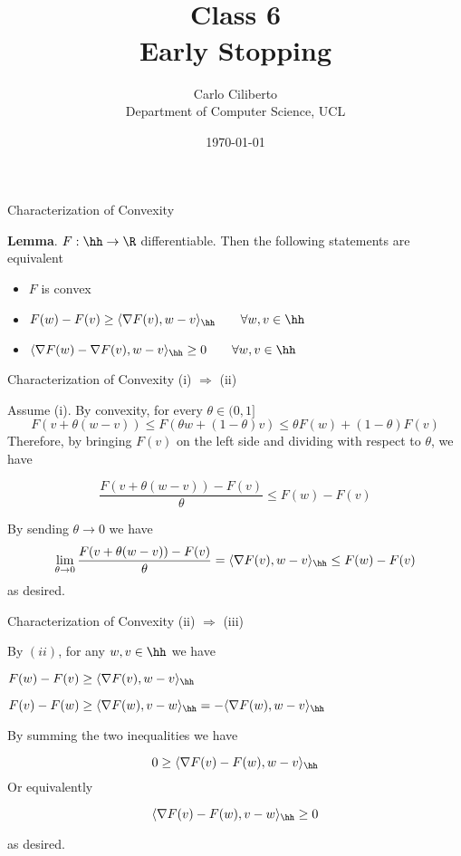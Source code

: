 \documentclass[10pt,mathserif]{beamer}
\title{\large \bfseries \\ Class 6 \\ Early Stopping}
\author{Carlo Ciliberto\\
Department of Computer Science, UCL}
\date{\today}
\begin{document}
\frame{
\thispagestyle{empty}
\titlepage
}



\begin{frame}{Characterization of Convexity}

{\bf Lemma}. $F:\hh\to\R$ differentiable. Then the following statements are equivalent

\begin{itemize}
  \item[(i)] $F$ is convex
  \item[(ii)] $F(w) - F(v) \geq \langle \nabla F(v), w - v\rangle_\hh \qquad \forall w,v\in\hh$
  \item[(iii)] $\langle \nabla F(w) - \nabla F(v), w - v\rangle_\hh \geq 0 \qquad \forall w,v\in\hh$
\end{itemize}

\end{frame}

\begin{frame}{Characterization of Convexity (i) $\Rightarrow$ (ii)}

Assume (i). By convexity, for every $\theta \in(0,1]$ 
$$
  F(v + \theta (w-v) ) \leq F(\theta w + (1-\theta) v) \leq \theta F(w) + (1-\theta) F(v)
$$
Therefore, by bringing $F(v)$ on the left side and dividing with respect to $\theta$, we have

$$
  \frac{F(v + \theta (w-v) ) - F(v)}{\theta} \leq  F(w) - F(v)
$$

By sending $\theta\to 0$ we have
$$
\lim_{\theta\to0} \frac{F(v + \theta (w-v) ) - F(v)}{\theta} = \langle\nabla F(v), w - v\rangle_\hh\leq F(w) - F(v)
$$
as desired.

\end{frame}



\begin{frame}{Characterization of Convexity (ii) $\Rightarrow$ (iii)}

By $(ii)$, for any $w,v\in\hh$ we have 
\bi
\item $F(w) - F(v) \geq \langle \nabla F(v), w - v\rangle_\hh$
\item $F(v) - F(w) \geq \langle \nabla F(w), v - w\rangle_\hh = - \langle \nabla F(w), w - v\rangle_\hh$
\ei

\vfill
By summing the two inequalities we have

$$
0 \geq \langle \nabla F(v) - F(w) , w - v\rangle_\hh
$$
Or equivalently 

$$
\langle \nabla F(v) - F(w) , v - w\rangle_\hh \geq 0
$$

as desired. 

\end{frame}
\end{document}
